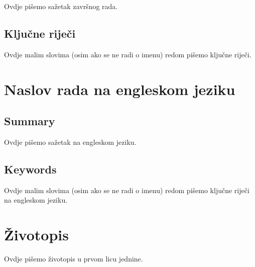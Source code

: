 \documentclass{mathos}
\begin{document}
Ovdje pišemo sažetak završnog rada.

\section*{Ključne riječi}

Ovdje malim slovima (osim ako se ne radi o imenu) redom pišemo ključne riječi.




\chapter*{Naslov rada na engleskom jeziku}

\section*{Summary}

Ovdje pišemo sažetak na engleskom jeziku.

\section*{Keywords}

Ovdje malim slovima (osim ako se ne radi o imenu) redom pišemo ključne riječi na engleskom jeziku.



\chapter*{Životopis}

Ovdje pišemo životopis u prvom licu jednine.
\end{document}
